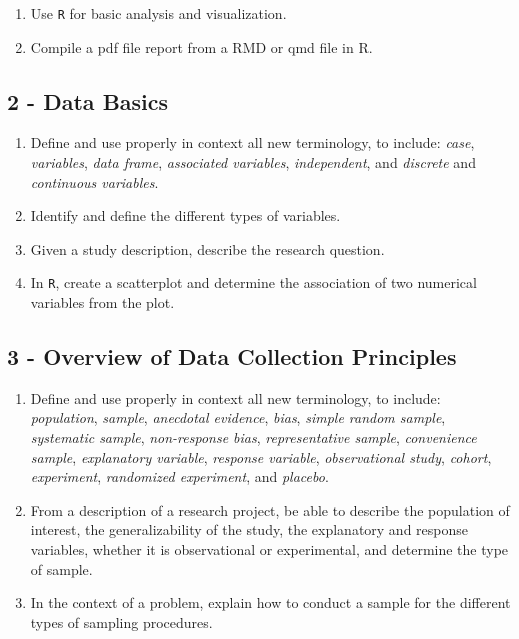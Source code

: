 \documentclass[
  letterpaper,
  DIV=11,
  numbers=noendperiod]{scrreprt}
\begin{document}
\begin{enumerate}
\def\labelenumi{\arabic{enumi})}
\item
  Use \texttt{R} for basic analysis and visualization.
\item
  Compile a pdf file report from a RMD or qmd file in R.
\end{enumerate}

\subsection*{2 - Data Basics}\label{data-basics}

\begin{enumerate}
\def\labelenumi{\arabic{enumi})}
\item
  Define and use properly in context all new terminology, to include:
  \emph{case}, \emph{variables}, \emph{data frame}, \emph{associated
  variables}, \emph{independent}, and \emph{discrete} and
  \emph{continuous variables}.
\item
  Identify and define the different types of variables.
\item
  Given a study description, describe the research question.
\item
  In \texttt{R}, create a scatterplot and determine the association of
  two numerical variables from the plot.
\end{enumerate}

\subsection*{3 - Overview of Data Collection
Principles}\label{overview-of-data-collection-principles}

\begin{enumerate}
\def\labelenumi{\arabic{enumi})}
\item
  Define and use properly in context all new terminology, to include:
  \emph{population}, \emph{sample}, \emph{anecdotal evidence},
  \emph{bias}, \emph{simple random sample}, \emph{systematic sample},
  \emph{non-response bias}, \emph{representative sample},
  \emph{convenience sample}, \emph{explanatory variable}, \emph{response
  variable}, \emph{observational study}, \emph{cohort},
  \emph{experiment}, \emph{randomized experiment}, and \emph{placebo}.
\item
  From a description of a research project, be able to describe the
  population of interest, the generalizability of the study, the
  explanatory and response variables, whether it is observational or
  experimental, and determine the type of sample.
\item
  In the context of a problem, explain how to conduct a sample for the
  different types of sampling procedures.
\end{enumerate}
\end{document}
